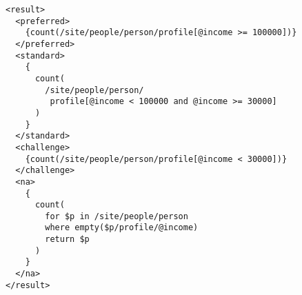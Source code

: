 \begin{lstlisting}[float=htpb, caption=Test query 20., frame=single, label=listing_test_query_20]
<result>
  <preferred>
    {count(/site/people/person/profile[@income >= 100000])}
  </preferred>
  <standard>
    {
      count(
        /site/people/person/
         profile[@income < 100000 and @income >= 30000]
      )
    }
  </standard>
  <challenge>
    {count(/site/people/person/profile[@income < 30000])}
  </challenge>
  <na>
    {
      count(
        for $p in /site/people/person
        where empty($p/profile/@income)
        return $p
      )
    }
  </na>
</result>
\end{lstlisting}